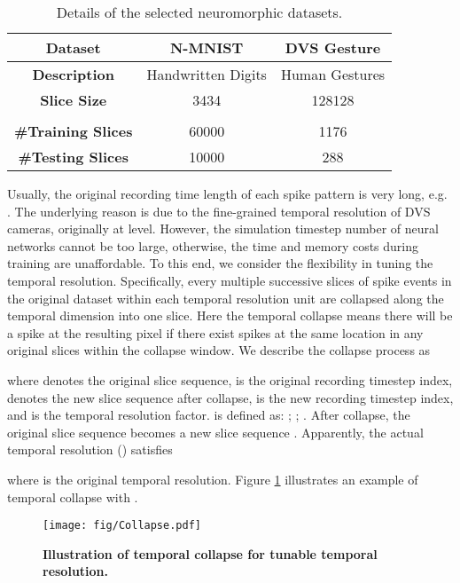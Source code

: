 \documentclass[journal,10pt,twocolumn]{IEEETran}
\begin{document}
\begin{table}[!htbp]
\caption{Details of the selected neuromorphic datasets.}
\label{tab:dataset}
\vspace{2pt}
\centering
\begin{tabular}{ccc}
\hline\hline
\textbf{Dataset}     & N-MNIST  & DVS Gesture      \\ \hline
\textbf{Description} & Handwritten Digits & Human Gestures \\
\textbf{Slice Size}  & 3434  & 128128  \\
       &                &  \\
\textbf{\#Training Slices} & 60000    & 1176   \\
\textbf{\#Testing Slices}  & 10000    & 288     \\ 
\hline\hline
\end{tabular}
\end{table}

Usually, the original recording time length of each spike pattern is very long, e.g. . The underlying reason is due to the fine-grained temporal resolution of DVS cameras, originally at  level. However, the simulation timestep number of neural networks cannot be too large, otherwise, the time and memory costs during training are unaffordable. To this end, we consider the flexibility in tuning the temporal resolution. Specifically, every multiple successive slices of spike events in the original dataset within each temporal resolution unit are collapsed along the temporal dimension into one slice. Here the temporal collapse means there will be a spike at the resulting pixel if there exist spikes at the same location in any original slices within the collapse window. We describe the collapse process as

where  denotes the original slice sequence,  is the original recording timestep index,  denotes the new slice sequence after collapse,  is the new recording timestep index, and  is the temporal resolution factor.  is defined as: ; ; . After collapse, the original slice sequence  becomes a new slice sequence  . Apparently, the actual temporal resolution () satisfies

where  is the original temporal resolution. Figure \ref{fig:collapse} illustrates an example of temporal collapse with . 

\begin{figure}[!htbp]
\centering     
\texttt{[image: fig/Collapse.pdf]}
\flushleft
\caption{\textbf{Illustration of temporal collapse for tunable temporal resolution.}} \label{fig:collapse} 
\end{figure}
\end{document}
